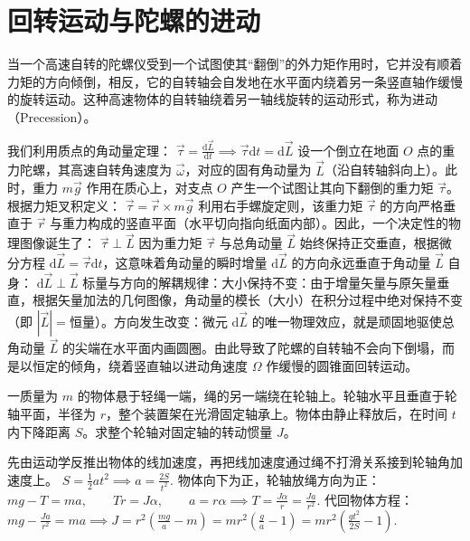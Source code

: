 \documentclass[lang=cn,11pt]{elegantbook}
\begin{document}
\section{回转运动与陀螺的进动}
\begin{definition}[进动]
当一个高速自转的陀螺仪受到一个试图使其“翻倒”的外力矩作用时，它并没有顺着力矩的方向倾倒，相反，它的自转轴会自发地在水平面内绕着另一条竖直轴作缓慢的旋转运动。这种高速物体的自转轴绕着另一轴线旋转的运动形式，称为进动（Precession）。
\end{definition}
我们利用质点的角动量定理： \(\vec{\tau} = \frac{\mathrm{d}\vec{L}}{\mathrm{d}t} \implies \vec{\tau}\mathrm{d}t = \mathrm{d}\vec{L}\) 设一个倒立在地面 $O$ 点的重力陀螺，其高速自转角速度为 $\vec{\omega}$，对应的固有角动量为 $\vec{L}$（沿自转轴斜向上）。此时，重力 $m\vec{g}$ 作用在质心上，对支点 $O$ 产生一个试图让其向下翻倒的重力矩 $\vec{\tau}$。根据力矩叉积定义： \(\vec{\tau} = \vec{r} \times m\vec{g}\) 利用右手螺旋定则，该重力矩 $\vec{\tau}$ 的方向严格垂直于 $\vec{r}$ 与重力构成的竖直平面（水平切向指向纸面内部）。因此，一个决定性的物理图像诞生了： \(\vec{\tau} \perp \vec{L}\) 因为重力矩 $\vec{\tau}$ 与总角动量 $\vec{L}$ 始终保持正交垂直，根据微分方程 $\mathrm{d}\vec{L} = \vec{\tau}\mathrm{d}t$，这意味着角动量的瞬时增量 $\mathrm{d}\vec{L}$ 的方向永远垂直于角动量 $\vec{L}$ 自身： \(\mathrm{d}\vec{L} \perp \vec{L}\) 标量与方向的解耦规律：大小保持不变：由于增量矢量与原矢量垂直，根据矢量加法的几何图像，角动量的模长（大小）在积分过程中绝对保持不变（即 $|\vec{L}| = \text{恒量}$）。方向发生改变：微元 $\mathrm{d}\vec{L}$ 的唯一物理效应，就是顽固地驱使总角动量 $\vec{L}$ 的尖端在水平面内画圆圈。由此导致了陀螺的自转轴不会向下倒塌，而是以恒定的倾角，绕着竖直轴以进动角速度 $\Omega$ 作缓慢的圆锥面回转运动。

\begin{exercise}
一质量为 \(m\) 的物体悬于轻绳一端，绳的另一端绕在轮轴上。轮轴水平且垂直于轮轴平面，半径为 \(r\)，整个装置架在光滑固定轴承上。物体由静止释放后，在时间 \(t\) 内下降距离 \(S\)。求整个轮轴对固定轴的转动惯量 \(J\)。
\end{exercise}
\begin{solution}
先由运动学反推出物体的线加速度，再把线加速度通过绳不打滑关系接到轮轴角加速度上。
 \(S=\frac12 at^2 \implies a=\frac{2S}{t^2}.\) 
物体向下为正，轮轴放绳方向为正：
 \(mg-T=ma,\qquad Tr=J\alpha,\qquad a=r\alpha\implies T=\frac{J\alpha}{r}=\frac{Ja}{r^2}.\) 
代回物体方程：
 \(mg-\frac{Ja}{r^2}=ma\implies J=r^2\left(\frac{mg}{a}-m\right) =mr^2\left(\frac{g}{a}-1\right)=mr^2\left(\frac{gt^2}{2S}-1\right).\) 
\end{solution}
\end{document}
